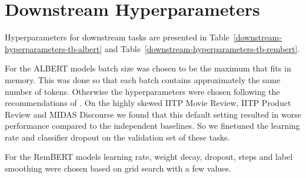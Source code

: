 \documentclass[11pt]{article}
\begin{document}
\section{Downstream Hyperparameters}
\label{sec:hype}
Hyperparameters for downstream tasks are presented in Table~\ref{downstream-hyperparameters-tb-albert} and Table~\ref{downstream-hyperparameters-tb-rembert}.

For the ALBERT models batch size was chosen to be the maximum that fits in memory. This was done so that each batch contains approximately the same number of tokens. Otherwise the hyperparameters were chosen following the recommendations of \citep{DBLP:conf/iclr/MosbachAK21}. On the highly skewed IITP Movie Review, IITP Product Review and MIDAS Discourse we found that this default setting resulted in worse performance compared to the independent baselines. So we finetuned the learning rate and classifier dropout on the validation set of these tasks.

For the RemBERT models learning rate, weight decay, dropout, steps and label smoothing were chosen based on grid search with a few values.
\end{document}
